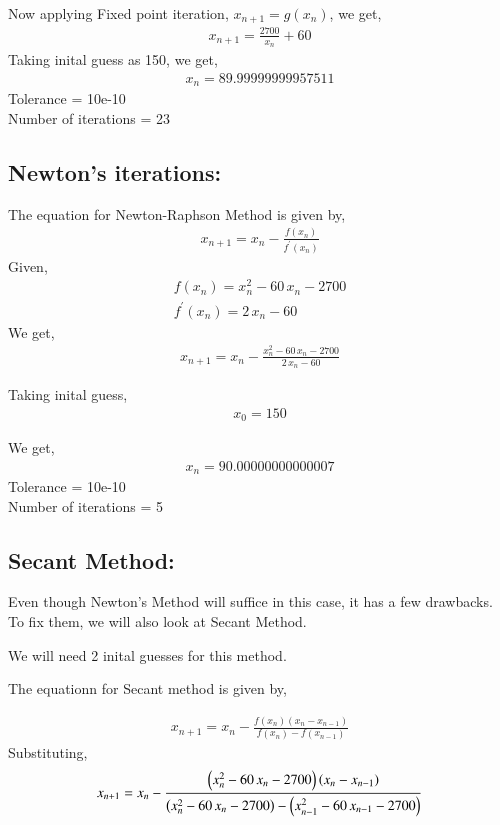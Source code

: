 \documentclass[journal]{IEEEtran}
\begin{document}
    Now applying Fixed point iteration, $x_{n+1} = g(x_n)$, we get,
    \begin{align}
        x_{n+1} = \frac{2700}{x_n} + 60
    \end{align}
    Taking inital guess as 150, we get,
    \begin{align}
        x_{n} = 89.99999999957511
    \end{align}
    Tolerance = 10e-10\\
    Number of iterations = 23


\subsection{Newton's iterations: }
    The equation for Newton-Raphson Method is given by,
    \begin{align}
        x_{n+1} = x_n - \frac{f(x_n)}{f^\prime(x_n)}
    \end{align}
    Given,
    \begin{align}
        f(x_n) = x_n^2 - 60\,x_n - 2700\\
        f^\prime(x_n) = 2\,x_n - 60
    \end{align}
    We get,
    \begin{align}
        x_{n+1} = x_n - \frac{x_n^2 - 60\,x_n - 2700}{2\,x_n - 60}
    \end{align}

    Taking inital guess,
    \begin{align}
        x_0 = 150
    \end{align}

    We get,
    \begin{align}
        x_n = 90.00000000000007
    \end{align}
    Tolerance = 10e-10\\
    Number of iterations = 5
\subsection{Secant Method: }
    Even though Newton's Method will suffice in this case, it has a few drawbacks. To fix them, we will also look at Secant Method.

    We will need 2 inital guesses for this method.

    The equationn for Secant method is given by,

    \begin{align}
        x_{n+1} = x_n - \frac{f(x_n)(x_n - x_{n-1})}{f(x_{n})-f(x_{n-1})}
    \end{align}
    Substituting,
    \begin{align}
        x_{n+1} = x_n - \frac{\left(x_n^2 - 60\,x_n - 2700\right)\left(x_n - x_{n-1}\right)}{\left(x_n^2 - 60\,x_n - 2700\right) - \left(x_{n-1}^2 - 60\,x_{n-1} - 2700\right)}
    \end{align}
\end{document}
